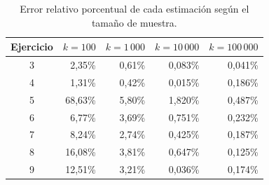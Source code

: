 \begin{table}[H]
\centering
\caption{Error relativo porcentual de cada estimaci\'on seg\'un el tama\~no de muestra.}
\label{tab:interr}
\small
\begin{tabular}{@{}crrrr@{}}
\toprule
Ejercicio & $k=100$ & $k=1\,000$ & $k=10\,000$ & $k=100\,000$ \\
\midrule
3 & 2,35\% & 0,61\% & 0,083\% & 0,041\% \\
4 & 1,31\% & 0,42\% & 0,015\% & 0,186\% \\
5 & 68,63\% & 5,80\% & 1,820\% & 0,487\% \\
6 & 6,77\% & 3,69\% & 0,751\% & 0,232\% \\
7 & 8,24\% & 2,74\% & 0,425\% & 0,187\% \\
8 & 16,08\% & 3,81\% & 0,647\% & 0,125\% \\
9 & 12,51\% & 3,21\% & 0,036\% & 0,174\% \\
\bottomrule
\end{tabular}
\end{table}